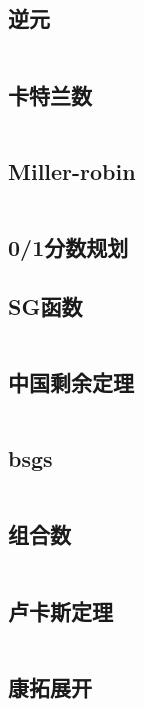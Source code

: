 \documentclass[a4paper,11pt]{article}
\begin{document}
\subsection{逆元} 
\inputminted[breaklines]{c++}{数论/逆元.cpp}

\subsection{卡特兰数} 

\inputminted[breaklines]{c++}{数论/卡特兰数.cpp}

\subsection{Miller-robin} 
\inputminted[breaklines]{c++}{数论/Miller-robin.cpp} 

\subsection{0/1分数规划} 


\subsection{SG函数} 
\inputminted[breaklines]{c++}{数论/SG函数.cpp} 

\subsection{中国剩余定理} 
\inputminted[breaklines]{c++}{数论/中国剩余定理.cpp}

\subsection{bsgs} 
\inputminted[breaklines]{c++}{数论/bsgs.cpp}

\subsection{组合数} 
\inputminted[breaklines]{c++}{数论/组合数.cpp}

\subsection{卢卡斯定理} 
\inputminted[breaklines]{c++}{数论/卢卡斯定理.cpp}

\subsection{康拓展开} 
\inputminted[breaklines]{c++}{数论/康拓展开.cpp} 
\end{document}
